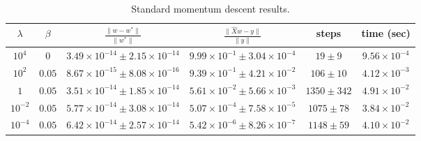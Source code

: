 \begin{table}[H]
\small
\centering
\begin{tabular}{c|c|c|c|c|c} \hline \hline
    $\lambda$& $\beta$ &$\frac{\lVert w - w^{*} \lVert}{\rVert w^{*} \lVert}$ & $\frac{\lVert \hat{X}w - y \lVert }{\lVert y \lVert}$ & steps & time (sec)\\ \hline \hline
    
    \rowcolor{gray!30} $10^4$ & $0$ & $ 3.49 \times 10^{-14} \pm 2.15 \times 10^{-14}$ &$9.99 \times 10^{-1} \pm 3.04 \times 10^{-4}$ & $19 \pm 9$& $9.56 \times 10^{-4}$ \\
    
    $10^2$ & $ 0.05$ & $ 8.67 \times 10^{-15} \pm 8.08 \times 10^{-16}$ &$9.39 \times 10^{-1} \pm 4.21 \times 10^{-2}$&$106 \pm 10$& $4.12 \times 10^{-3}$ \\
    
    \rowcolor{gray!30} $1$ & $0.05$ & $ 3.51 \times 10^{-14} \pm 1.85 \times 10^{-14} $ &$ 5.61 \times 10^{-2} \pm 5.66 \times 10^{-3} $&$1350 \pm 342$& $4.91 \times 10^{-2}$ \\
    
    $10^{-2}$ & $ 0.05$ & $5.77 \times 10^{-14} \pm 3.08 \times 10^{-14}$ & $5.07 \times 10^{-4} \pm 7.58 \times 10^{-5}$&$1075 \pm 78$& $3.84 \times 10^{-2}$ \\
    
    \rowcolor{gray!30} $10^{-4}$ & $0.05$ & $6.42 \times 10^{-14} \pm 2.57 \times 10^{-14}$ &$5.42 \times 10^{-6} \pm 8.26 \times 10^{-7}$&$1148 \pm 59$ & $4.10 \times 10^{-2}$ \\
    \hline \hline
\end{tabular}
\caption{Standard momentum descent results.}
\label{tab:smd_results}
\end{table}
